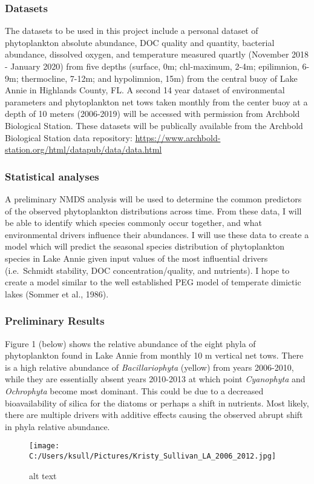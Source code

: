 \documentclass[
]{article}
\begin{document}
\hypertarget{datasets}{%
\subsubsection{Datasets}\label{datasets}}

The datasets to be used in this project include a personal dataset of
phytoplankton absolute abundance, DOC quality and quantity, bacterial
abundance, dissolved oxygen, and temperature measured quartly (November
2018 - January 2020) from five depths (surface, 0m; chl-maximum, 2-4m;
epilimnion, 6-9m; thermocline, 7-12m; and hypolimnion, 15m) from the
central buoy of Lake Annie in Highlands County, FL. A second 14 year
dataset of environmental parameters and phytoplankton net tows taken
monthly from the center buoy at a depth of 10 meters (2006-2019) will be
accessed with permission from Archbold Biological Station. These
datasets will be publically available from the Archbold Biological
Station data repository:
\url{https://www.archbold-station.org/html/datapub/data/data.html}

\hypertarget{statistical-analyses}{%
\subsubsection{Statistical analyses}\label{statistical-analyses}}

A preliminary NMDS analysis will be used to determine the common
predictors of the observed phytoplankton distributions across time. From
these data, I will be able to identify which species commonly occur
together, and what environmental drivers influence their abundances. I
will use these data to create a model which will predict the seasonal
species distribution of phytoplankton species in Lake Annie given input
values of the most influential drivers (i.e.~Schmidt stability, DOC
concentration/quality, and nutrients). I hope to create a model similar
to the well established PEG model of temperate dimictic lakes (Sommer et
al., 1986).

\hypertarget{preliminary-results}{%
\subsubsection{Preliminary Results}\label{preliminary-results}}

Figure 1 (below) shows the relative abundance of the eight phyla of
phytoplankton found in Lake Annie from monthly 10 m vertical net tows.
There is a high relative abundance of \emph{Bacillariophyta} (yellow)
from years 2006-2010, while they are essentially absent years 2010-2013
at which point \emph{Cyanophyta} and \emph{Ochrophyta} become most
dominant. This could be due to a decreased bioavailability of silica for
the diatoms or perhaps a shift in nutrients. Most likely, there are
multiple drivers with additive effects causing the observed abrupt shift
in phyla relative abundance.

\begin{figure}
\centering
\texttt{[image: C:/Users/ksull/Pictures/Kristy\_Sullivan\_LA\_2006\_2012.jpg]}
\caption{alt text}
\end{figure}
\end{document}
